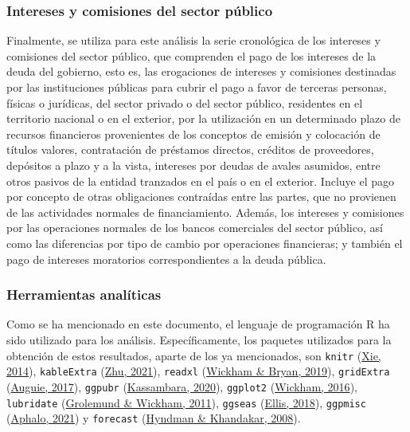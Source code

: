 \documentclass[
]{article}
\begin{document}
\subsubsection{Intereses y comisiones del sector público}

Finalmente, se utiliza para este análisis la serie cronológica de los
intereses y comisiones del sector público, que comprenden el pago de los
intereses de la deuda del gobierno, esto es, las erogaciones de
intereses y comisiones destinadas por las instituciones públicas para
cubrir el pago a favor de terceras personas, físicas o jurídicas, del
sector privado o del sector público, residentes en el territorio
nacional o en el exterior, por la utilización en un determinado plazo de
recursos financieros provenientes de los conceptos de emisión y
colocación de títulos valores, contratación de préstamos directos,
créditos de proveedores, depósitos a plazo y a la vista, intereses por
deudas de avales asumidos, entre otros pasivos de la entidad tranzados
en el país o en el exterior. Incluye el pago por concepto de otras
obligaciones contraídas entre las partes, que no provienen de las
actividades normales de financiamiento. Además, los intereses y
comisiones por las operaciones normales de los bancos comerciales del
sector público, así como las diferencias por tipo de cambio por
operaciones financieras; y también el pago de intereses moratorios
correspondientes a la deuda pública.

\subsubsection{Herramientas analíticas}

Como se ha mencionado en este documento, el lenguaje de programación R
ha sido utilizado para los análisis. Específicamente, los paquetes
utilizados para la obtención de estos resultados, aparte de los ya
mencionados, son \texttt{knitr} (\protect\hyperlink{ref-knitr}{Xie,
2014}), \texttt{kableExtra} (\protect\hyperlink{ref-kableExtra}{Zhu,
2021}), \texttt{readxl} (\protect\hyperlink{ref-readxl}{Wickham \&
Bryan, 2019}), \texttt{gridExtra}
(\protect\hyperlink{ref-gridExtra}{Auguie, 2017}), \texttt{ggpubr}
(\protect\hyperlink{ref-ggpubr}{Kassambara, 2020}), \texttt{ggplot2}
(\protect\hyperlink{ref-ggplot2}{Wickham, 2016}), \texttt{lubridate}
(\protect\hyperlink{ref-lubridate}{Grolemund \& Wickham, 2011}),
\texttt{ggseas} (\protect\hyperlink{ref-ggseas}{Ellis, 2018}),
\texttt{ggpmisc} (\protect\hyperlink{ref-ggpmisc}{Aphalo, 2021}) y
\texttt{forecast} (\protect\hyperlink{ref-forecast}{Hyndman \&
Khandakar, 2008}).
\end{document}
